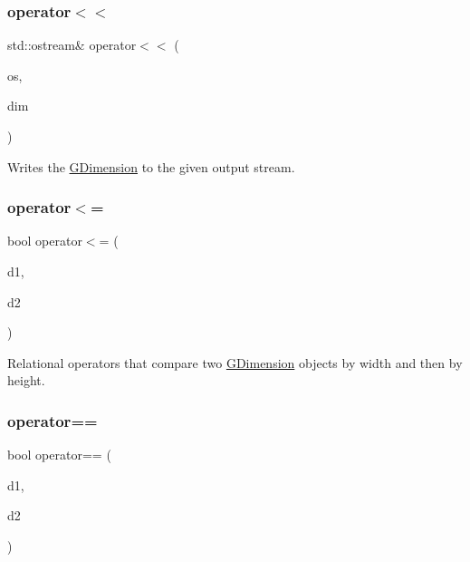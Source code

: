 \subsubsection{\texorpdfstring{operator$<$$<$}{operator<<}}
{\footnotesize\ttfamily std\+::ostream\& operator$<$$<$ (\begin{DoxyParamCaption}\item[{std\+::ostream \&}]{os,  }\item[{const \mbox{\hyperlink{structGDimension}{G\+Dimension}} \&}]{dim }\end{DoxyParamCaption})\hspace{0.3cm}{\ttfamily [friend]}}



Writes the \mbox{\hyperlink{structGDimension}{G\+Dimension}} to the given output stream. 

\mbox{\label{structGDimension_af6f17bbe9041aee1572fc7be059bec62}} 
\subsubsection{\texorpdfstring{operator$<$=}{operator<=}}
{\footnotesize\ttfamily bool operator$<$= (\begin{DoxyParamCaption}\item[{const \mbox{\hyperlink{structGDimension}{G\+Dimension}} \&}]{d1,  }\item[{const \mbox{\hyperlink{structGDimension}{G\+Dimension}} \&}]{d2 }\end{DoxyParamCaption})\hspace{0.3cm}{\ttfamily [friend]}}



Relational operators that compare two \mbox{\hyperlink{structGDimension}{G\+Dimension}} objects by width and then by height. 

\mbox{\label{structGDimension_a6bdb9d07a69c8f061d887e6f24750640}} 
\subsubsection{\texorpdfstring{operator==}{operator==}}
{\footnotesize\ttfamily bool operator== (\begin{DoxyParamCaption}\item[{const \mbox{\hyperlink{structGDimension}{G\+Dimension}} \&}]{d1,  }\item[{const \mbox{\hyperlink{structGDimension}{G\+Dimension}} \&}]{d2 }\end{DoxyParamCaption})\hspace{0.3cm}{\ttfamily [friend]}}




